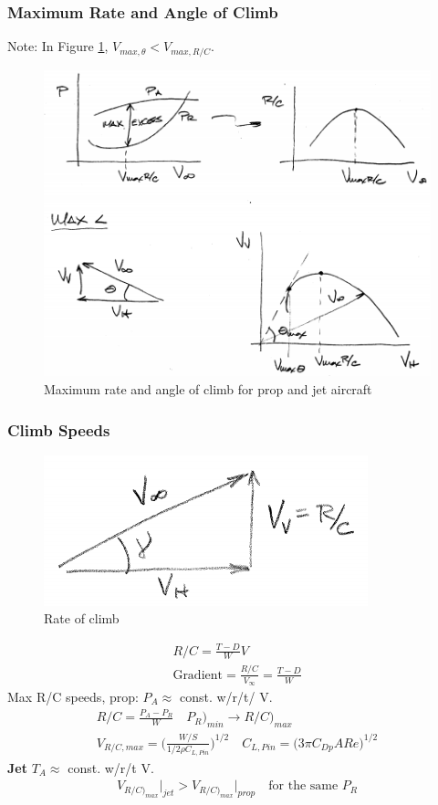 \documentclass[draft=false, titlepage]{article}
\begin{document}
\subsubsection{Maximum Rate and Angle of Climb}
Note: In Figure \ref{fig:p78_maxRateAngleofClimb}, $V_{max,\theta} < V_{max,R/C}$.
 \begin{figure}[ht]
	\centering
	\includegraphics[width=0.7\linewidth]{Figures/p78_maxRateAngleofClimb}
	\caption{Maximum rate and angle of climb for prop and jet aircraft}
	\label{fig:p78_maxRateAngleofClimb}
\end{figure}

\subsubsection{Climb Speeds}
 \begin{figure}[ht]
	\centering
	\includegraphics[width=0.3\linewidth]{Figures/p79_climbSpeedVInfty}
	\caption{Rate of climb}
	\label{fig:p79_climbSpeedVInfty}
\end{figure}
\begin{gather}
R/C = \frac{T-D}{W}V\\
\text{Gradient} = \frac{R/C}{V_\infty} = \frac{T-D}{W}
\end{gather}
Max R/C speeds, prop: $P_A \approx $ const. w/r/t/ V.
\begin{gather*}
R/C = \frac{P_A-P_R}{W} \quad P_R\big)_{min} \rightarrow R/C \big)_{max}\\
V_{R/C,max} = \Big(\frac{W/S}{1/2 \rho C_{L,Pin}}\Big)^{1/2} \quad C_{L,Pin} = \big(3 \pi C_{Dp} AR e\big)^{1/2}
\end{gather*}
\textbf{Jet} $T_A \approx$ const. w/r/t V.
\begin{gather*}
V_{R/C)_{max}}\Big|_{jet} > V_{R/C)_{max}}\Big|_{prop} \quad \text{for the same }P_R
\end{gather*}
\end{document}
